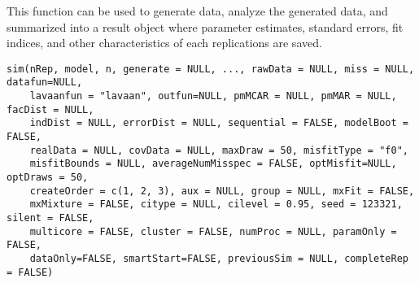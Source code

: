 \documentclass[a4paper]{book}
\begin{document}
%
\begin{Description}\relax
This function can be used to generate data, analyze the generated data, and summarized into a result object where parameter estimates, standard errors, fit indices, and other characteristics of each replications are saved. 
\end{Description}
%
\begin{Usage}
\begin{verbatim}
sim(nRep, model, n, generate = NULL, ..., rawData = NULL, miss = NULL, datafun=NULL, 
	lavaanfun = "lavaan", outfun=NULL, pmMCAR = NULL, pmMAR = NULL, facDist = NULL, 
	indDist = NULL, errorDist = NULL, sequential = FALSE, modelBoot = FALSE, 
	realData = NULL, covData = NULL, maxDraw = 50, misfitType = "f0", 
	misfitBounds = NULL, averageNumMisspec = FALSE, optMisfit=NULL, optDraws = 50, 
	createOrder = c(1, 2, 3), aux = NULL, group = NULL, mxFit = FALSE, 
	mxMixture = FALSE, citype = NULL, cilevel = 0.95, seed = 123321, silent = FALSE, 
	multicore = FALSE, cluster = FALSE, numProc = NULL, paramOnly = FALSE, 
	dataOnly=FALSE, smartStart=FALSE, previousSim = NULL, completeRep = FALSE)
\end{verbatim}
\end{Usage}
%
\end{document}
